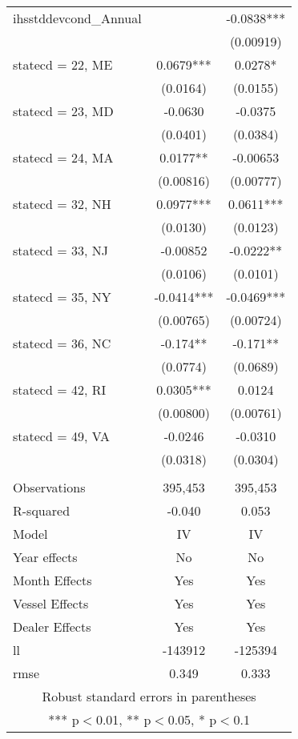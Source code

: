 \begin{tabular}{lcc}
ihsstddevcond\_Annual &  & -0.0838*** \\
 &  & (0.00919) \\
statecd = 22, ME & 0.0679*** & 0.0278* \\
 & (0.0164) & (0.0155) \\
statecd = 23, MD & -0.0630 & -0.0375 \\
 & (0.0401) & (0.0384) \\
statecd = 24, MA & 0.0177** & -0.00653 \\
 & (0.00816) & (0.00777) \\
statecd = 32, NH & 0.0977*** & 0.0611*** \\
 & (0.0130) & (0.0123) \\
statecd = 33, NJ & -0.00852 & -0.0222** \\
 & (0.0106) & (0.0101) \\
statecd = 35, NY & -0.0414*** & -0.0469*** \\
 & (0.00765) & (0.00724) \\
statecd = 36, NC & -0.174** & -0.171** \\
 & (0.0774) & (0.0689) \\
statecd = 42, RI & 0.0305*** & 0.0124 \\
 & (0.00800) & (0.00761) \\
statecd = 49, VA & -0.0246 & -0.0310 \\
 & (0.0318) & (0.0304) \\
 &  &  \\
Observations & 395,453 & 395,453 \\
R-squared & -0.040 & 0.053 \\
Model & IV & IV \\
Year effects & No & No \\
Month Effects & Yes & Yes \\
Vessel Effects & Yes & Yes \\
Dealer Effects & Yes & Yes \\
ll & -143912 & -125394 \\
 rmse & 0.349 & 0.333 \\ \hline
\multicolumn{3}{c}{ Robust standard errors in parentheses} \\
\multicolumn{3}{c}{ *** p$<$0.01, ** p$<$0.05, * p$<$0.1} \\
\end{tabular}
